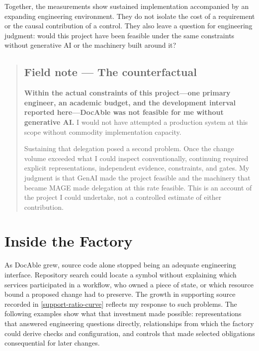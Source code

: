 Together, the measurements show sustained implementation accompanied by an expanding engineering environment. They do not isolate the cost of a requirement or the causal contribution of a control. They also leave a question for engineering judgment: would this project have been feasible under the same constraints without generative AI or the machinery built around it?


\begin{quote}
\mbox{}%
\subsection{Field note --- The counterfactual}\label{heading:fieldnote-counterfactual}

\textbf{Within the actual constraints of this project---one primary engineer, an academic budget, and the development interval reported here---DocAble was not feasible for me without generative AI.} I would not have attempted a production system at this scope without commodity implementation capacity.

Sustaining that delegation posed a second problem. Once the change volume exceeded what I could inspect conventionally, continuing required explicit representations, independent evidence, constraints, and gates. My judgment is that GenAI made the project feasible and the machinery that became MAGE made delegation at this rate feasible. This is an account of the project I could undertake, not a controlled estimate of either contribution.
\end{quote}

\section{Inside the Factory}\label{heading:inside-the-factory}



As DocAble grew, source code alone stopped being an adequate engineering interface. Repository search could locate a symbol without explaining which services participated in a workflow, who owned a piece of state, or which resource bound a proposed change had to preserve. The growth in supporting source recorded in \autoref{support-ratio-curve} reflects my response to such problems. The following examples show what that investment made possible: representations that answered engineering questions directly, relationships from which the factory could derive checks and configuration, and controls that made selected obligations consequential for later changes.


